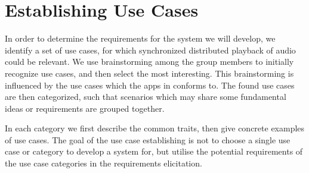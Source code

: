 \chapter{Establishing Use Cases}
\label{cha:establishing_use_cases}
In order to determine the requirements for the system we will develop, we identify a set of use cases, for which synchronized distributed playback of audio could be relevant.
We use brainstorming among the group members to initially recognize use cases, and then select the most interesting.
This brainstorming is influenced by the use cases which the apps in  conforms to.
The found use cases are then categorized, such that scenarios which may share some fundamental ideas or requirements are grouped together.

In each category we first describe the common traits, then give concrete examples of use cases.
The goal of the use case establishing is not to choose a single use case or category to develop a system for, but utilise the potential requirements of the use case categories in the requirements elicitation.


